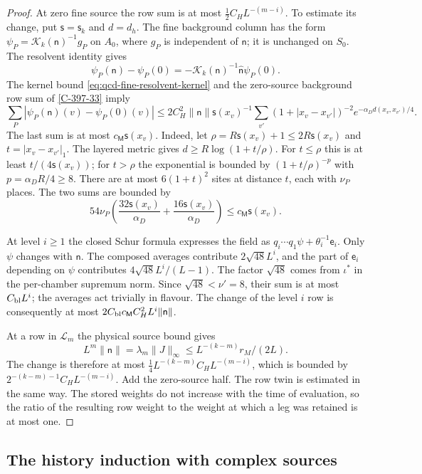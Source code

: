 \documentclass[11pt,letterpaper,reqno]{amsart}
\theoremstyle{definition}
\theoremstyle{remark}
\begin{document}
\begin{proof}
At zero fine source the row sum is at most
$\tfrac12 C_HL^{-(m-i)}$. To estimate its change, put
$\mathsf s=\mathsf s_k$ and $d=d_h$. The fine background
column has the form $\psi_P=\mathcal K_k(\mathsf n)^{-1}g_P$
on $A_0$, where $g_P$ is independent of $\mathsf n$; it is
unchanged on $S_0$. The resolvent identity gives
\[
 \psi_P(\mathsf n)-\psi_P(0)
   =-\mathcal K_k(\mathsf n)^{-1}\hat{\mathsf n}\psi_P(0).
\]
The kernel bound \eqref{eq:qcd-fine-resolvent-kernel} and the
zero-source background row sum of \cref{C-397-33} imply
\[
 \sum_P|\psi_P(\mathsf n)(v)-\psi_P(0)(v)|
 \le2C_H^2\|\mathsf n\|\mathsf s(x_v)^{-1}
 \sum_{v'}(1+|x_v-x_{v'}|)^{-2}e^{-\alpha_Dd(x_v,x_{v'})/4}.
\]
The last sum is at most $c_{\mathsf M}\mathsf s(x_v)$.
Indeed, let $\rho=R\mathsf s(x_v)+1\le2R\mathsf s(x_v)$
and $t=|x_v-x_{v'}|_1$. The layered metric gives
$d\ge R\log(1+t/\rho)$. For $t\le\rho$ this is at least
$t/(4\mathsf s(x_v))$; for $t>\rho$ the exponential is
bounded by $(1+t/\rho)^{-p}$ with $p=\alpha_DR/4\ge8$.
There are at most $6(1+t)^2$ sites at distance $t$, each with
$\nu_P$ places. The two sums are bounded by
\[
 54\nu_P\left(\frac{32\mathsf s(x_v)}{\alpha_D}
              +\frac{16\mathsf s(x_v)}{\alpha_D}\right)
 \le c_{\mathsf M}\mathsf s(x_v).
\]

At level $i\ge1$ the closed Schur formula expresses the field
as $q_i\cdots q_1\psi+\theta_i^{-1}\mathsf e_i$. Only $\psi$
changes with $\mathsf n$. The composed averages contribute
$2\sqrt{48}L^i$, and the part of $\mathsf e_i$ depending on $\psi$
contributes $4\sqrt{48}L^i/(L-1)$. The factor $\sqrt{48}$
comes from $\iota^*$ in the per-chamber supremum norm.
Since $\sqrt{48}<\nu'=8$, their sum is at most
$C_{\rm bl}L^i$; the averages act trivially in flavour.
The change of the level
$i$ row is consequently at most
$2C_{\rm bl}c_{\mathsf M}C_H^2L^i\|\mathsf n\|$.

At a row in $\mathcal L_m$ the physical source bound gives
\[
 L^m\|\mathsf n\|=\lambda_m\|J\|_\infty
 \le L^{-(k-m)}r_M/(2L).
\]
The change is therefore at most
$\tfrac14L^{-(k-m)}C_HL^{-(m-i)}$, which is bounded by
$2^{-(k-m)-1}C_HL^{-(m-i)}$. Add the zero-source half.
The row twin is estimated in the same way. The stored weights
do not increase with the time of evaluation, so the ratio of
the resulting row weight to the weight at which a leg was
retained is at most one.
\end{proof}

\subsection{The history induction with complex sources}
\end{document}
